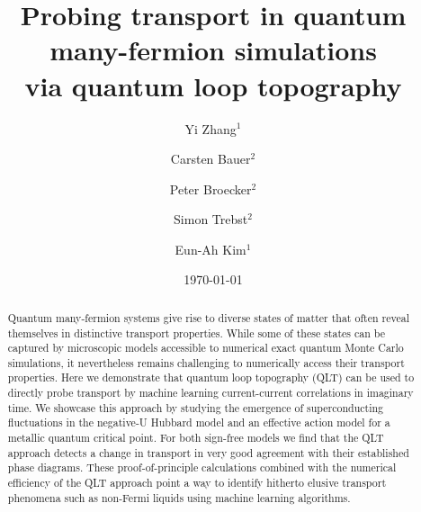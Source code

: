\documentclass[amsmath,amssymb, aps, prx, longbibliography, twocolumn]{revtex4-1}
\begin{document}
\title{ Probing transport in quantum many-fermion simulations\\ via quantum loop topography}

\author{Yi Zhang$^1$}
\author{Carsten Bauer$^2$}
\author{Peter Broecker$^2$} 
\author{Simon Trebst$^2$}
\author{Eun-Ah Kim$^1$}

%

\date{\today}%

\begin{abstract}
Quantum many-fermion systems give rise to diverse states of matter that often reveal themselves in distinctive transport properties. While some of these states can be captured by microscopic models accessible to numerical exact quantum Monte Carlo simulations, it nevertheless remains challenging to  numerically access their transport properties. 
Here we demonstrate that quantum loop topography (QLT) can be used to directly probe transport by machine learning current-current correlations in imaginary time.
We showcase this approach by studying the emergence of superconducting fluctuations in the negative-U Hubbard model and  
an effective action model for a metallic %
quantum critical point. 
For both sign-free models we find that the QLT approach detects a change in transport in very good agreement with their established 
phase diagrams.
These proof-of-principle calculations combined with the numerical efficiency of the QLT approach point a way to identify hitherto elusive
transport phenomena such as non-Fermi liquids using machine learning algorithms.
\end{abstract}

\maketitle

\end{document}
